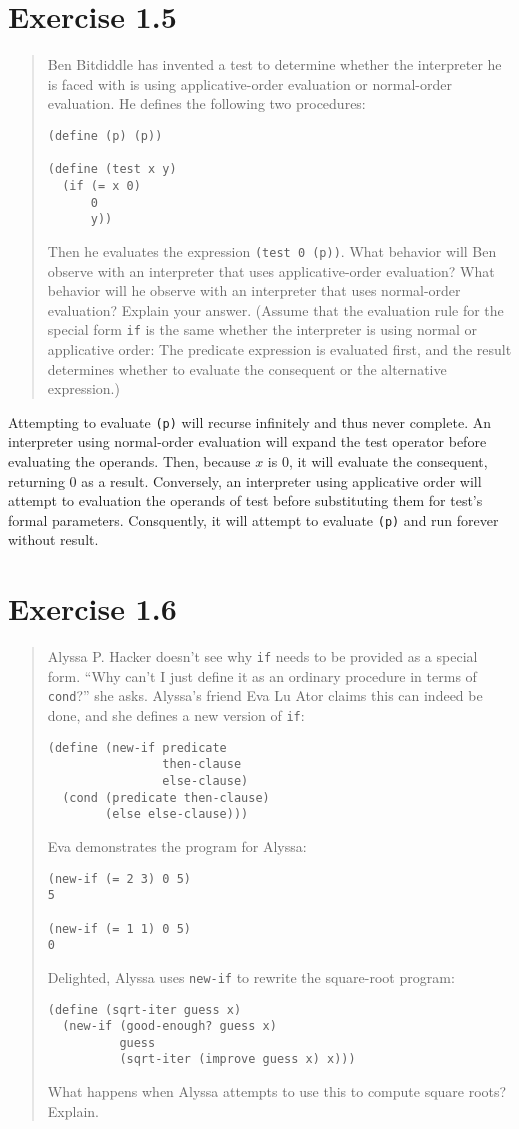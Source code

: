 \documentclass{article}
\begin{document}
\section{Exercise 1.5}
\begin{quote}
    Ben Bitdiddle has invented a test to determine whether the interpreter he is
    faced with is using applicative-order evaluation or normal-order evaluation.
    He defines the following two procedures:
    \begin{lstlisting}
(define (p) (p))

(define (test x y)
  (if (= x 0)
      0
      y))
	\end{lstlisting}
	Then he evaluates the expression \verb|(test 0 (p))|. What behavior
	will Ben observe with an interpreter that uses applicative-order evaluation?
	What behavior will he observe with an interpreter that uses normal-order
	evaluation? Explain your answer. (Assume that the evaluation rule for the
	special form \verb|if| is the same whether the interpreter is using
	normal or applicative order: The predicate expression is evaluated first,
	and the result determines whether to evaluate the consequent or the
	alternative expression.)
\end{quote}

Attempting to evaluate \verb|(p)| will recurse infinitely and thus never
complete. An interpreter using normal-order evaluation will expand the test
operator before evaluating the operands. Then, because $x$ is 0, it will
evaluate the consequent, returning 0 as a result. Conversely, an interpreter
using applicative order will attempt to evaluation the operands of test before
substituting them for test's formal parameters. Consquently, it will attempt to
evaluate \verb|(p)| and run forever without result.

\section{Exercise 1.6}
\begin{quote}
    Alyssa P. Hacker doesn’t see why \verb|if| needs to be provided as a
    special form.  “Why can’t I just define it as an ordinary procedure in
    terms of \verb|cond|?” she asks. Alyssa’s friend Eva Lu Ator claims
    this can indeed be done, and she defines a new version of \verb|if|:
	\begin{lstlisting}
(define (new-if predicate
                then-clause
                else-clause)
  (cond (predicate then-clause)
        (else else-clause)))
	\end{lstlisting}
	Eva demonstrates the program for Alyssa:
	\begin{lstlisting}
(new-if (= 2 3) 0 5)
5

(new-if (= 1 1) 0 5)
0
	\end{lstlisting}
    Delighted, Alyssa uses \verb|new-if| to rewrite the square-root
    program:
	\begin{lstlisting}
(define (sqrt-iter guess x)
  (new-if (good-enough? guess x)
          guess
          (sqrt-iter (improve guess x) x)))
	\end{lstlisting}
	What happens when Alyssa attempts to use this to compute square roots?
	Explain.
\end{quote}
\end{document}

